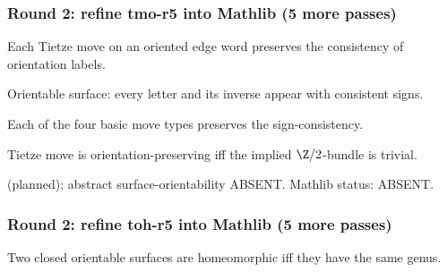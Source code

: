 \subsubsection*{Round 2: refine tmo-r5 into Mathlib (5 more passes)}

\begin{lemma}
\label{lem:tmo-r6}
Each Tietze move on an oriented edge word preserves the consistency of orientation labels.
\leanok
\end{lemma}

\begin{lemma}
\label{lem:tmo-r7}
Orientable surface: every letter and its inverse appear with consistent signs.
\leanok
\end{lemma}

\begin{lemma}
\label{lem:tmo-r8}
Each of the four basic move types preserves the sign-consistency.
\leanok
\end{lemma}

\begin{lemma}
\label{lem:tmo-r9}
Tietze move is orientation-preserving iff the implied $\Z/2$-bundle is trivial.
\leanok
\end{lemma}

\begin{lemma}
\label{lem:tmo-r10}
 (planned); abstract surface-orientability ABSENT.  Mathlib status: ABSENT.
\leanok
\end{lemma}

\subsubsection*{Round 2: refine toh-r5 into Mathlib (5 more passes)}

\begin{lemma}
\label{lem:toh-r6}
Two closed orientable surfaces are homeomorphic iff they have the same genus.
\leanok
\end{lemma}

